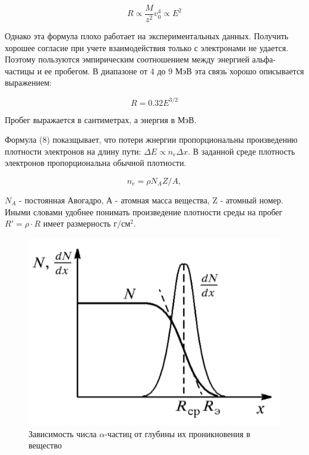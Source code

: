 \documentclass[a4paper]{article}
\begin{document}
\begin{equation}
    R \propto \frac{M}{z^2} v_0^4 \propto E^2
\end{equation}

Однако эта формула плохо работает на экспериментальных данных. Получить хорошее согласие при учете взаимодействия только с
электронами не удается. Поэтому пользуются эмпирическим соотношением между энергией альфа-частицы и ее пробегом.
В диапазоне от 4 до 9 МэВ эта связь хорошо описывается выражением:

\begin{equation}
    R = 0.32 E^{3/2}
\end{equation}

Пробег выражается в сантиметрах, а энергия в МэВ. \par 

Формула (8) показщывает, что потери жнергии пропорциональны произведению плотности электронов на длину пути:
$\Delta E \propto n_e \Delta x$. В заданной среде плотность электронов пропорциональна обычной плотности.

\begin{equation}
    n_e = \rho N_A Z/A,
\end{equation}

$N_A$ - постоянная Авогадро, А - атомная масса вещества, Z - атомный номер. Иными словами удобнее понимать произведение 
плотности среды на пробег $R' = \rho \cdot R$ имеет размерность $г/см^2$. 

\begin{figure}
    \includegraphics[scale = 0.6]{number.png}
    \caption{Зависимость числа $\alpha$-частиц от глубины их проникновения в вещество}
    \label{ris number}
\end{figure}
\end{document}
